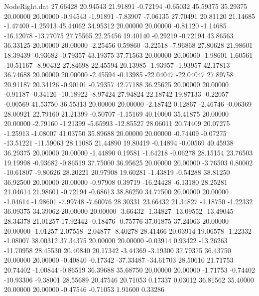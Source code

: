 \begin{filecontents}{NodeRight.dat}
  27.66428   20.94543   21.91891    -0.72194   -0.65032   45.59375   35.29375   20.00000   20.00000   -0.94543   -1.91891   -7.83907   -7.06135
  27.70491   20.81120   21.14685    -1.47400   -1.25913   45.44062   34.95312   20.00000   20.00000   -0.81120   -1.14685  -16.12078  -13.77075
  27.75565   22.25456   19.40140    -0.29219   -0.72194   43.86563   36.33125   20.00000   20.00000   -2.25456    0.59860   -3.22518   -7.96868
  27.80628   21.98601   18.39439    -0.93682   -0.79357   43.19375   37.71563   20.00000   20.00000   -1.98601    1.60561  -10.51167   -8.90432
  27.84698   22.45594   20.13985    -1.93957   -1.93957   42.17813   36.74688   20.00000   20.00000   -2.45594   -0.13985  -22.04047  -22.04047
  27.89758   20.91187   20.34126    -0.90101   -0.79357   42.77188   36.25625   20.00000   20.00000   -0.91187   -0.34126  -10.18922   -8.97424
  27.94824   22.18742   19.87133    -0.22057   -0.00569   41.53750   36.55313   20.00000   20.00000   -2.18742    0.12867   -2.46746   -0.06369
  28.00921   22.79160   21.21399    -0.50707   -1.15169   40.10000   35.41875   20.00000   20.00000   -2.79160   -1.21399   -5.65993  -12.85527
  28.06011   20.74409   20.07275    -1.25913   -1.08007   41.03750   35.89688   20.00000   20.00000   -0.74409   -0.07275  -13.51221  -11.59063
  28.11085   21.44890   19.80419    -0.14894   -0.00569   40.45938   36.29375   20.00000   20.00000   -1.44890    0.19581   -1.64218   -0.06278
  28.15154   23.76503   19.19998    -0.93682   -0.86519   37.75000   36.95625   20.00000   20.00000   -3.76503    0.80002  -10.61807   -9.80626
  28.20221   20.97908   19.60281    -1.43819   -0.54288   38.81250   36.92500   20.00000   20.00000   -0.97908    0.39719  -16.24428   -6.13180
  28.25281   21.04614   21.98601    -0.72194   -0.68613   38.86250   34.77500   20.00000   20.00000   -1.04614   -1.98601   -7.99748   -7.60076
  28.30331   23.66432   21.34827    -1.18750   -1.22332   36.09375   34.39062   20.00000   20.00000   -3.66432   -1.34827  -13.09552  -13.49045
  28.34378   21.01257   17.92442    -0.18476   -0.75776   37.01875   37.24063   20.00000   20.00000   -1.01257    2.07558   -2.04877   -8.40278
  28.41466   20.03914   19.06578    -1.22332   -1.08007   38.00312   37.34375   20.00000   20.00000   -0.03914    0.93422  -13.26263  -11.70958
  28.45530   20.40840   20.17342    -3.44369   -3.19300   37.79375   36.43750   20.00000   20.00000   -0.40840   -0.17342  -37.33487  -34.61703
  28.50610   21.71753   20.74402    -1.00844   -0.86519   36.39688   35.68750   20.00000   20.00000   -1.71753   -0.74402  -10.93306   -9.38001
  28.55689   20.47546   20.71053     0.17337    0.03012   36.81562   35.40000   20.00000   20.00000   -0.47546   -0.71053    1.91600    0.33286

\end{filecontents}
